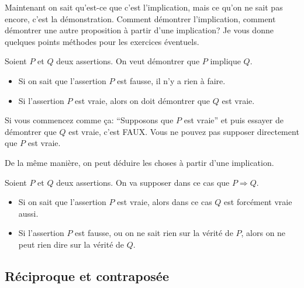 \documentclass{article}
\begin{document}
Maintenant on sait qu'est-ce que c'est l'implication, mais ce qu'on ne sait pas encore, c'est la démonstration. Comment démontrer l'implication, comment démontrer une autre proposition à partir d'une implication? Je vous donne quelques points méthodes pour les exercices éventuels.

\begin{tcolorbox}[colback=green!5!white,colframe=green!75!black,title=Point méthode 1.2]

Soient $P$ et $Q$ deux assertions. On veut démontrer que $P$ implique $Q$.

\begin{itemize}
 \item Si on sait que l'assertion $P$ est fausse, il n'y a rien à faire.
 \item Si l'assertion $P$ est vraie, alors on doit démontrer que $Q$ est vraie.
\end{itemize}

\tcblower

Si vous commencez comme \c ca: ``Supposons que $P$ est vraie'' et puis essayer de démontrer que $Q$ est vraie, c'est FAUX. Vous ne pouvez pas supposer directement que $P$ est vraie.

\end{tcolorbox}

De la même manière, on peut déduire les choses à partir d'une implication.

\begin{tcolorbox}[colback=green!5!white,colframe=green!75!black,title=Point méthode 1.3]

Soient $P$ et $Q$ deux assertions. On va supposer dans ce cas que $P \Rightarrow Q$.

\begin{itemize}
 \item Si on sait que l'assertion $P$ est vraie, alors dans ce cas $Q$ est forcément vraie aussi.
 \item Si l'assertion $P$ est fausse, ou on ne sait rien sur la vérité de $P$, alors on ne peut rien dire sur la vérité de $Q$.
\end{itemize}



\end{tcolorbox}

\subsection{Réciproque et contraposée}
\end{document}
